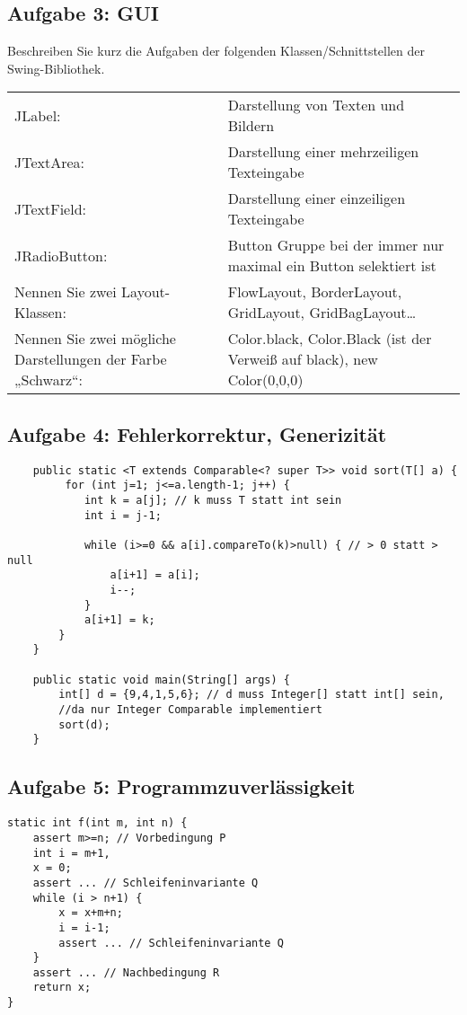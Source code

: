 \documentclass[a4paper, 10pt]{article}
\begin{document}
\subsection*{Aufgabe 3: GUI}
Beschreiben Sie kurz die Aufgaben der folgenden
Klassen/Schnittstellen der Swing-Bibliothek.\\

\begin{tabular}{p{5cm}p{15cm}}
JLabel: & Darstellung von Texten und Bildern \\
JTextArea: & Darstellung einer mehrzeiligen Texteingabe\\
JTextField: & Darstellung einer einzeiligen Texteingabe\\
JRadioButton: & Button Gruppe bei der immer nur maximal ein Button selektiert ist\\
Nennen Sie zwei Layout-Klassen: & FlowLayout, BorderLayout, GridLayout, GridBagLayout\ldots\\
Nennen Sie zwei mögliche Darstellungen der Farbe „Schwarz“: & Color.black, Color.Black (ist der Verweiß auf black), new Color(0,0,0)
\end{tabular}

\subsection*{Aufgabe 4: Fehlerkorrektur, Generizität}

\begin{lstlisting}
    public static <T extends Comparable<? super T>> void sort(T[] a) {
         for (int j=1; j<=a.length-1; j++) {
         	int k = a[j]; // k muss T statt int sein
         	int i = j-1;
         	
         	while (i>=0 && a[i].compareTo(k)>null) { // > 0 statt > null
         		a[i+1] = a[i];
         		i--;
         	}
         	a[i+1] = k;
        }
    }
    
    public static void main(String[] args) {
        int[] d = {9,4,1,5,6}; // d muss Integer[] statt int[] sein, 
        //da nur Integer Comparable implementiert
        sort(d);
    }
\end{lstlisting}

\subsection*{Aufgabe 5: Programmzuverlässigkeit}

\begin{lstlisting}
static int f(int m, int n) {
	assert m>=n; // Vorbedingung P
	int i = m+1,
	x = 0;
	assert ... // Schleifeninvariante Q
	while (i > n+1) {
		x = x+m+n;
		i = i-1;
		assert ... // Schleifeninvariante Q
	}
	assert ... // Nachbedingung R
	return x;
}
\end{lstlisting}
\end{document}
